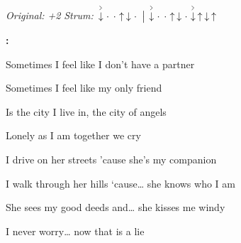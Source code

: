 \begin{song}


\begin{headerbox}
\RaiseBoxWithAccents
\textit{Original: +2} \quad
\textit{Strum:} $\AccentDown\Miss\Miss\Up\Down\Miss \Separator \AccentDown\Miss\Miss\Up\Down\Miss\AccentDown\Up\Down\Up$
\end{headerbox}

\begin{hchordbox}
\normalsize
{}
\large
\end{hchordbox}

\begin{chordbox}
\normalsize
\vspace{16em}
\large
\end{chordbox}

\large

\bigskip

\Intro\textbf{:}    

\bigskip

 Sometimes I feel like I don't have a partner \par
{} Sometimes I feel like my only friend \par
Is the city I live in, the city of angels \par
{}Lonely as I am together we cry \par
{} \par

\bigskip

I drive on her streets 'cause she's my companion \par
I walk through her hills ‘cause… she knows who I am \par
She sees my good deeds and… she kisses me windy \par
{}I never worry… now that is a lie \par
{} \par


\end{song}
